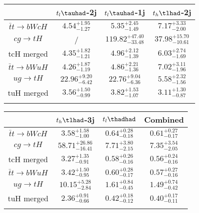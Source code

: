 \centering
\begin{tabular}{cccc} \toprule\toprule
 & $t_l\tauhad$-2j & $t_l\tauhad$-1j & $t_h\tlhad$-2j\\\midrule
$\bar{t}t\to bWcH$ & $4.54^{+1.95}_{-1.27}$ & $5.35^{+2.45}_{-1.49}$ & $7.17^{+3.33}_{-2.00}$\\
$cg\to tH$ &  / & $119.82^{+47.40}_{-33.48}$ & $37.98^{+15.70}_{-10.61}$\\
tcH merged & $4.35^{+1.82}_{-1.21}$ & $4.96^{+2.12}_{-1.39}$ & $6.03^{+2.74}_{-1.69}$\\
$\bar{t}t\to bWuH$ & $4.26^{+1.87}_{-1.19}$ & $4.86^{+2.21}_{-1.36}$ & $7.02^{+3.11}_{-1.96}$\\
$ug\to tH$ & $22.96^{+9.20}_{-6.42}$ & $22.76^{+9.04}_{-6.36}$ & $5.58^{+2.32}_{-1.56}$\\
tuH merged & $3.56^{+1.50}_{-0.99}$ & $3.82^{+1.53}_{-1.07}$ & $3.11^{+1.30}_{-0.87}$\\
\bottomrule\bottomrule\\
\end{tabular}
\begin{tabular}{cccc} \toprule\toprule
 & $t_h\tlhad$-3j & $t_l\thadhad$ & Combined\\\midrule
$\bar{t}t\to bWcH$ & $3.58^{+1.58}_{-1.00}$ & $0.64^{+0.28}_{-0.18}$ & $0.61^{+0.27}_{-0.17}$\\
$cg\to tH$ & $58.71^{+26.86}_{-16.41}$ & $7.71^{+3.80}_{-2.15}$ & $7.35^{+3.54}_{-2.05}$\\
tcH merged & $3.27^{+1.35}_{-0.91}$ & $0.58^{+0.26}_{-0.16}$ & $0.56^{+0.24}_{-0.16}$\\
$\bar{t}t\to bWuH$ & $3.42^{+1.50}_{-0.95}$ & $0.60^{+0.28}_{-0.17}$ & $0.57^{+0.27}_{-0.16}$\\
$ug\to tH$ & $10.15^{+5.28}_{-2.84}$ & $1.61^{+0.84}_{-0.45}$ & $1.49^{+0.74}_{-0.42}$\\
tuH merged & $2.36^{+0.91}_{-0.66}$ & $0.42^{+0.18}_{-0.12}$ & $0.40^{+0.17}_{-0.11}$\\
\bottomrule\bottomrule\\
\end{tabular}